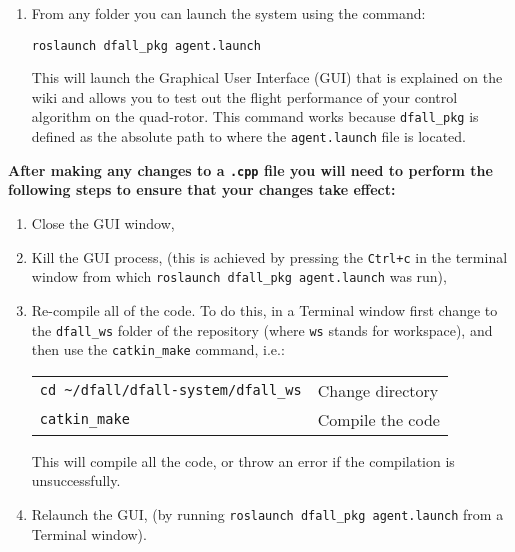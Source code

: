 \documentclass[]{report}
\newcommand{\roslaunchcommand}{roslaunch dfall\_pkg agent.launch}
\newcommand{\rospackagename}{dfall\_pkg}
\newcommand{\launchfilename}{agent.launch}
\newcommand{\catkinmakefullpath}{\textasciitilde/dfall/dfall-system/dfall\_ws}
\newcommand{\workspacefoldername}{dfall\_ws}
\begin{document}
\begin{enumerate}[topsep=-1pt , itemsep=1pt ,  label = \textbf{(\arabic{*})} ]
		
		\item From any folder you can launch the system using the command:
		
		\begin{center}
			\large{\texttt{\roslaunchcommand}}
		\end{center}
	
		This will launch the Graphical User Interface (GUI) that is explained on the wiki and allows you to test out the flight performance of your control algorithm on the quad-rotor. This command works because \texttt{\rospackagename} is defined as the absolute path to where the \texttt{\launchfilename} file is located.
	\end{enumerate}

	\clearpage

	\begin{center}
		\textbf{After making any changes to a \texttt{.cpp} file you will need to perform the following steps to ensure that your changes take effect:}
	\end{center}
	
	\begin{enumerate}[topsep=-1pt , itemsep=1pt ,  label = \textbf{(\arabic{*})} ]
		\item Close the GUI window,
		\item Kill the GUI process, (this is achieved by pressing the \texttt{Ctrl+c} in the terminal window from which \texttt{\roslaunchcommand} was run),
		\item Re-compile all of the code. To do this, in a Terminal window first change to the \texttt{\workspacefoldername} folder of the repository (where \texttt{ws} stands for workspace), and then use the \texttt{catkin\_make} command, i.e.:
		
		\begin{center}
			\begin{tabular}{ll}
				\large{\texttt{cd \catkinmakefullpath}}
				& Change directory
				\\
				\large{\texttt{catkin\_make}}
				& Compile the code
			\end{tabular}
		\end{center}
		
		This will compile all the code, or throw an error if the compilation is unsuccessfully.
		
		\item Relaunch the GUI, (by running \texttt{\roslaunchcommand} from a Terminal window).
	\end{enumerate}
	
\end{document}
